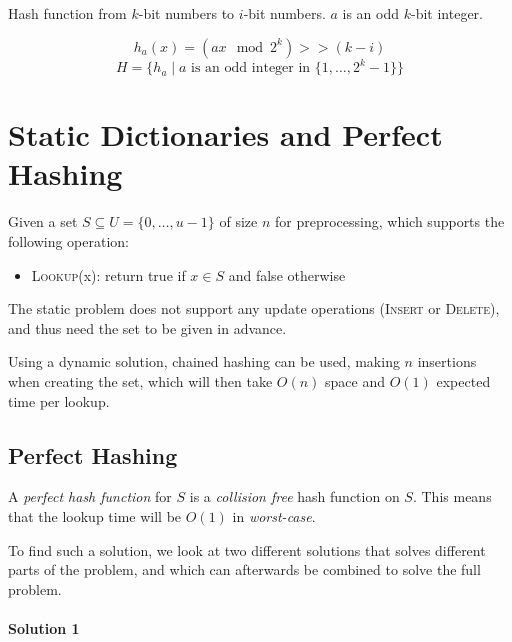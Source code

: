             Hash function from $k$-bit numbers to $i$-bit numbers. $a$ is an odd $k$-bit integer.

            \begin{definition}
                \[ h_a(x) = (ax \mod 2^k) >> (k - i) \]
                \[ H = \{h_a \mid a \text{ is an odd integer in } \{1, \ldots, 2^k - 1\}\} \]
            \end{definition}

    \section{Static Dictionaries and Perfect Hashing}

        \begin{definition}
            Given a set $S \subseteq U = \{0, \ldots, u-1\}$ of size $n$ for preprocessing, which supports the following operation:
            \begin{itemize}
                \item \textsc{Lookup}(x): return true if $x \in S$ and false otherwise
            \end{itemize}
        \end{definition}

        The static problem does not support any update operations (\textsc{Insert} or \textsc{Delete}), and thus need the set to be given in advance.

        Using a dynamic solution, chained hashing can be used, making $n$ insertions when creating the set, which will then take $O(n)$ space and $O(1)$ expected time per lookup.

        \subsection{Perfect Hashing}

            A \emph{perfect hash function} for $S$ is a \emph{collision free} hash function on $S$. This means that the lookup time will be $O(1)$ in \emph{worst-case}.

            To find such a solution, we look at two different solutions that solves different parts of the problem, and which can afterwards be combined to solve the full problem.

            \paragraph{Solution 1}

